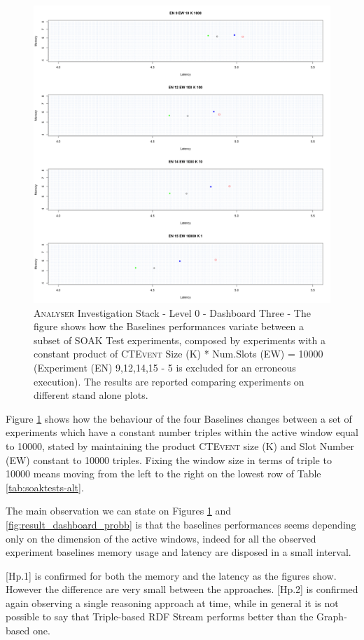 \begin{figure}[h!tbp]
	\centering
	\includegraphics[width=0.75\linewidth]{images/dashboard-3-split}	
	\caption[\textsc{Analyser} Investigation Stack - Level 0 - Dashboard Three - Split Version]	{\textsc{Analyser} Investigation Stack - Level 0 - Dashboard Three - The figure shows how the Baselines performances variate between a subset of SOAK Test experiments, composed by experiments with a constant product of \textsc{CTEvent} Size (K) * Num.Slots (EW) = 10000 (Experiment (EN) 9,12,14,15 - 5 is excluded for an erroneous execution).  The results are reported comparing experiments on different stand alone plots.}
	\label{fig:result_dashboard_proba}
\end{figure}

Figure \ref{fig:result_dashboard_proba}  shows how the behaviour of the four Baselines changes between a set of experiments which have a constant number triples within the active window equal to 10000, stated by maintaining the product \textsc{CTEvent} size (K) and Slot Number (EW) constant to 10000 triples. Fixing the window size in terms of triple to 10000 means moving from the left to the right on the lowest row of Table \ref{tab:soaktests-alt}. 

The main observation we can state on Figures \ref{fig:result_dashboard_proba} and \ref{fig:result_dashboard_probb}  is that the baselines performances seems depending only on the dimension of the active windows, indeed for all the observed experiment  baselines memory usage and latency are disposed in a small interval.

[Hp.1] is confirmed for both the memory and the latency as the figures show. However the difference are very small between the approaches. [Hp.2] is confirmed again observing a single reasoning approach at time, while in general it is not possible to say that Triple-based RDF Stream performs better than the Graph-based one.

